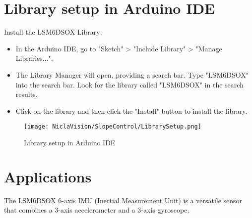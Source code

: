 \section{Library setup in Arduino IDE}

Install the LSM6DSOX Library:

\begin{itemize}
	\item In the Arduino IDE, go to "Sketch" > "Include Library" > "Manage Libraries...".
	\item The Library Manager will open, providing a search bar.
	Type "LSM6DSOX" into the search bar.
	Look for the library called "LSM6DSOX" in the search results.
	\item Click on the library and then click the "Install" button to install the library.
\end{itemize}
\begin{figure}[h!]
	\centering
	\texttt{[image: NiclaVision/SlopeControl/LibrarySetup.png]}
	\caption{Library setup in Arduino IDE}
\end{figure}


\section{Applications}

 The LSM6DSOX 6-axis IMU (Inertial Measurement Unit) is a versatile sensor that combines a 3-axis accelerometer and a 3-axis gyroscope.

